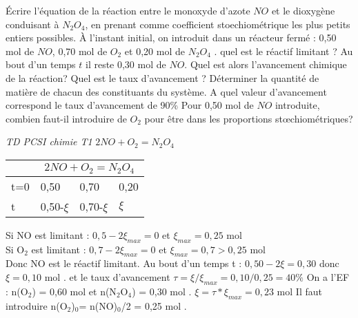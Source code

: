 \begin{Exercise}[title=Taux d'avancement]
	\Question Écrire l'équation de la réaction entre le monoxyde d'azote $NO$ et
    le dioxygène conduisant à $N_2O_4$, en prenant comme coefficient
    stoechiométrique les plus petits entiers possibles.
    \Question À l'instant initial, on introduit dans un réacteur fermé : 0,50
    mol de $NO$, 0,70 mol de $O_2$ et 0,20 mol de $N_2O_4$ . quel est le réactif
    limitant ?
    \Question Au bout d'un temps $t$ il reste 0,30 mol de $NO$.
		\subQuestion Quel est alors l'avancement chimique de la réaction?
		\subQuestion Quel est le taux d'avancement ?
		\subQuestion Déterminer la quantité de matière de chacun des constituants du système.
	\Question A quel valeur d'avancement correspond le taux d'avancement de 90\%
	\Question Pour 0,50 mol de $NO$ introduite, combien faut-il introduire de $O_2$ pour être dans les proportions stœchiométriques?
    \end{Exercise}
\begin{Answer}
\emph{TD PCSI chimie T1 }
	\Question $2NO + O_2 = N_2O_4$
	\Question
	\begin{center}
			\begin{tabular}{l|l|l|l}

		 	    &\multicolumn{3}{c}{$2NO + O_2 = N_2O_4$}\\
			\hline
	 		t=0 & 0,50       & 0,70       & 0,20 \\
	  		t   & 0,50-$\xi$ & 0,70-$\xi$ & $\xi$ \\
			\hline
		\end{tabular}
	\end{center}
	Si NO est limitant : $ 0,5 - 2 \xi_{max} = 0 $ et $\xi_{max} = 0,25$ mol \\
	Si O$_2$ est limitant : $ 0,7 - 2 \xi_{max} = 0 $ et $\xi_{max} = 0,7 > 0,25 $ mol \\
	Donc NO est le réactif limitant.
	\Question Au bout d'un temps t :  $0,50 - 2 \xi = 0,30$ donc $\xi = 0,10$ mol .
    et le taux d'avancement $\tau = \xi /\xi_{max}=0,10/0,25=40 \% $
    On a l'EF : n(O$_2$) = 0,60 mol et n(N$_2$O$_4$) = 0,30 mol .
	\Question $\xi = \tau * \xi_{max}  = 0,23$ mol
	\Question Il faut introduire n(O$_2$)$_0$= n(NO)$_0$/2 = 0,25 mol .
\end{Answer}
